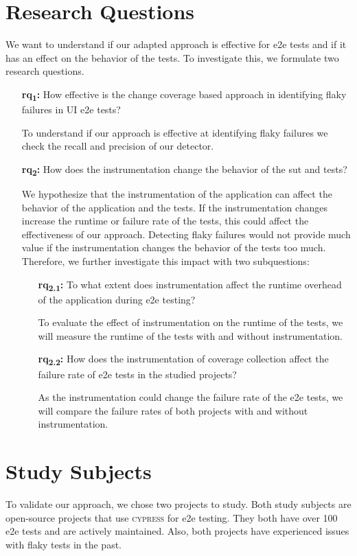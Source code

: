 \section{Research Questions}
We want to understand if our adapted approach is effective for \ac{e2e} tests and if it has an effect on the behavior of the tests.
To investigate this, we formulate two research questions.
\begin{enumerate}
	\item[\textbf{\acs{rq}\textsubscript{1}:}] How effective is the change coverage based approach in identifying flaky failures in UI \ac{e2e} tests?

		To understand if our approach is effective at identifying flaky failures we check the recall and precision of our detector.
	\item[\textbf{\acs{rq}\textsubscript{2}:}] How does the instrumentation change the behavior of the \ac{sut} and tests?

		We hypothesize that the instrumentation of the application can affect the behavior of the application and the tests.
		If the instrumentation changes increase the runtime or failure rate of the tests, this could affect the effectiveness of our approach.
		Detecting flaky failures would not provide much value if the instrumentation changes the behavior of the tests too much.
		Therefore, we further investigate this impact with two subquestions:
		\begin{enumerate}
			\item[\textbf{\acs{rq}\textsubscript{2.1}:}] To what extent does instrumentation affect the runtime overhead of the application during \acs{e2e} testing?

				To evaluate the effect of instrumentation on the runtime of the tests, we will measure the runtime of the tests with and without instrumentation.
			\item[\textbf{\acs{rq}\textsubscript{2.2}:}] How does the instrumentation of coverage collection affect the failure rate of \ac{e2e} tests in the studied projects?

				As the instrumentation could change the failure rate of the \ac{e2e} tests, we will compare the failure rates of both projects with and without instrumentation.
		\end{enumerate}
\end{enumerate}

\section{Study Subjects}
To validate our approach, we chose two projects to study.
Both study subjects are open-source projects that use \textsc{cypress} for \ac{e2e} testing.
They both have over 100 \ac{e2e} tests and are actively maintained.
Also, both projects have experienced issues with flaky tests in the past.

